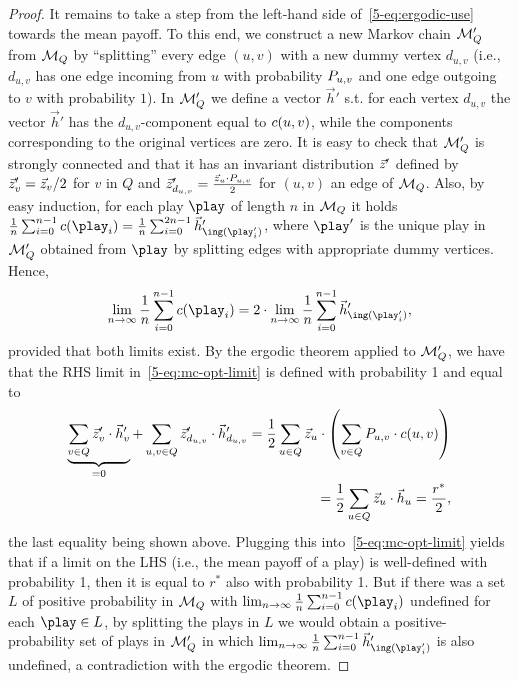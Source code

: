 \begin{proof}
It remains to take a step from the left-hand side of~\cref{5-eq:ergodic-use} towards the mean payoff. To this end, we construct a new Markov chain $\mathcal{M}_Q'$ from $\mathcal{M}_Q$ by ``splitting'' every edge $(u,v)$ with a new dummy vertex $d_{u,v}$ (i.e., $d_{u,v}$ has one edge incoming from $u$ with probability $P_{u,v}$ and one edge outgoing to $v$ with probability $1$). In $\mathcal{M}_Q'$ we define a vector $\vec{h}'$ s.t. for each vertex $d_{u,v}$ the vector $ \vec{h}' $ has the $ d_{u,v} $-component equal to $c(u,v)$, while the components corresponding to the original vertices are zero. It is easy to check that $\mathcal{M}_Q'$  is strongly connected and that it has an invariant distribution $\vec{z}'$ defined by $\vec{z}'_v=\vec{z}_v/2$ for $v$ in $Q$ and $\vec{z}'_{d_{u,v}}=\frac{\vec{z}_u\cdot P_{u,v}}{2}$ for $(u,v)$ an edge of $\mathcal{M}_Q$.
Also, by easy induction, for each play $\play$ of length $n$ in $\mathcal{M}_Q$ it holds $\frac{1}{n}\sum_{i=0}^{n-1}\colouring(\play_i) = \frac{1}{n}\sum_{i=0}^{2n-1}\vec{h}'_{\ing(\play_i')}$, where $\play'$ is the unique play in $\mathcal{M}_Q'$ obtained from $\play$ by splitting edges with appropriate dummy vertices. Hence, 
\begin{equation}
\label{5-eq:mc-opt-limit}
\lim_{n\rightarrow \infty}\frac{1}{n}\sum_{i=0}^{n-1}\colouring(\play_i) = 2\cdot \lim_{n\rightarrow \infty}\frac{1}{n}\sum_{i=0}^{n-1}\vec{h}'_{\ing(\play_i')},\end{equation} provided that both limits exist. By the ergodic theorem  applied to $\mathcal{M}_Q'$, we have that the RHS  limit in~\cref{5-eq:mc-opt-limit} is defined with probability 1 and equal to
\begin{align*}
\underbrace{\sum_{v\in Q} \vec{z}'_v \cdot \vec{h}'_{v}}_{=0} + \sum_{u,v\in Q} \vec{z}'_{d_{u,v}}\cdot \vec{h}'_{d_{u,v}} = \frac{1}{2}\sum_{u\in Q}\vec{z}_u\cdot\left( \sum_{v\in Q}P_{u,v}\cdot c(u,v)\right)\\ =\frac{1}{2}\sum_{u\in Q} \vec{z}_u\cdot \vec{h}_u=\frac{r^*}{2},
\end{align*}
\noindent
the last equality being shown above. Plugging this into~\cref{5-eq:mc-opt-limit} yields that if a limit on the LHS (i.e., the mean payoff of a play) is well-defined with probability 1, then it is equal to $r^*$ also with probability 1. But if there was a set $L$ of positive probability in $\mathcal{M}_Q$ with $\lim_{n \rightarrow \infty}\frac{1}{n}\sum_{i=0}^{n-1}\colouring(\play_i)$ undefined for each $\play\in L$, by splitting the plays in $L$ we would obtain a positive-probability set of plays in $\mathcal{M}_Q'$ in which $\lim_{n \rightarrow \infty}\frac{1}{n}\sum_{i=0}^{n-1}\vec{h}'_{\ing(\play_i')}$ is also undefined, a contradiction with the ergodic theorem. 

\end{proof}
